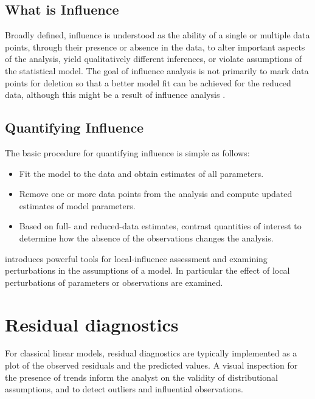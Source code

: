\documentclass[Chap5amain.tex]{subfiles}
\begin{document}
\subsection{What is Influence} %

Broadly defined, influence is understood as the ability of a single or multiple data points, through their presence or absence in the data, to alter important aspects of the analysis, yield qualitatively different inferences, or violate assumptions of the statistical model. The goal of influence analysis is not primarily to mark data
points for deletion so that a better model fit can be achieved for the reduced data, although this might be a result of influence analysis \citep{schabenberger}.

\subsection{Quantifying Influence}  %

The basic procedure for quantifying influence is simple as follows:

\begin{itemize}
	\item Fit the model to the data and obtain estimates of all parameters.
	\item Remove one or more data points from the analysis and compute updated estimates of model parameters.
	\item Based on full- and reduced-data estimates, contrast quantities of interest to determine how the absence of the observations changes the analysis.
\end{itemize}

\citet{cook86} introduces powerful tools for local-influence assessment and examining perturbations in the assumptions of a model. In particular the effect of local perturbations of parameters or observations are examined.



\newpage
\section{Residual diagnostics} %
For classical linear models, residual diagnostics are typically implemented as a plot of the observed residuals and the predicted values. A visual inspection for the presence of trends inform the analyst on the validity of distributional assumptions, and to detect outliers and influential observations.
\end{document}
